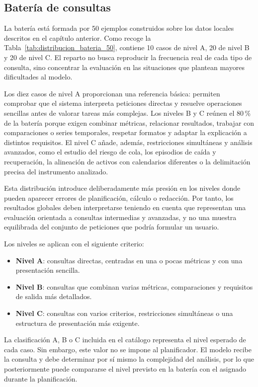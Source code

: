 \subsection{Batería de consultas}

La batería está formada por 50 ejemplos construidos sobre los datos locales descritos en el capítulo anterior. Como recoge la Tabla~\ref{tab:distribucion_bateria_50}, contiene 10 casos de nivel A, 20 de nivel B y 20 de nivel C. El reparto no busca reproducir la frecuencia real de cada tipo de consulta, sino concentrar la evaluación en las situaciones que plantean mayores dificultades al modelo.

Los diez casos de nivel A proporcionan una referencia básica: permiten comprobar que el sistema interpreta peticiones directas y resuelve operaciones sencillas antes de valorar tareas más complejas. Los niveles B y C reúnen el 80\,\% de la batería porque exigen combinar métricas, relacionar resultados, trabajar con comparaciones o series temporales, respetar formatos y adaptar la explicación a distintos requisitos. El nivel C añade, además, restricciones simultáneas y análisis avanzados, como el estudio del riesgo de cola, los episodios de caída y recuperación, la alineación de activos con calendarios diferentes o la delimitación precisa del instrumento analizado.

Esta distribución introduce deliberadamente más presión en los niveles donde pueden aparecer errores de planificación, cálculo o redacción. Por tanto, los resultados globales deben interpretarse teniendo en cuenta que representan una evaluación orientada a consultas intermedias y avanzadas, y no una muestra equilibrada del conjunto de peticiones que podría formular un usuario.

Los niveles se aplican con el siguiente criterio:

\begin{itemize}
    \item \textbf{Nivel A}: consultas directas, centradas en una o pocas métricas y con una presentación sencilla.
    \item \textbf{Nivel B}: consultas que combinan varias métricas, comparaciones y requisitos de salida más detallados.
    \item \textbf{Nivel C}: consultas con varios criterios, restricciones simultáneas o una estructura de presentación más exigente.
\end{itemize}

La clasificación A, B o C incluida en el catálogo representa el nivel esperado de cada caso. Sin embargo, este valor no se impone al planificador. El modelo recibe la consulta y debe determinar por sí mismo la complejidad del análisis, por lo que posteriormente puede compararse el nivel previsto en la batería con el asignado durante la planificación.

